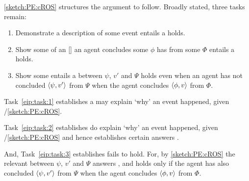 \begin{note}
  \autoref{sketch:PE:cROS} structures the argument to follow.
  Broadly stated, three tasks remain:

  \begin{enumerate}[label=\arabic*., ref=\arabic*]
  \item
    \label{eip:task:1}
    Demonstrate a description of some event entails a \ros{} holds.
  \item
    \label{eip:task:2}
    Show some \se{} of an [] an agent concludes some  \(\phi\) has  from some  \(\Phi\) entails a \ros{} holds.
  \item
    \label{eip:task:3}
    Show some \se{} entails a \ros{} between \(\psi\), \(v'\) and \(\Psi\) holds even when an agent has not concluded \(\langle\psi, v'\rangle\) from \(\Psi\) when the agent concludes \(\langle\phi, v\rangle\) from \(\Phi\).
  \end{enumerate}

  Task~\ref{eip:task:1} establishes a  may explain `why' an event happened, given \progExII{}/\autoref{sketch:PE:cROS}.

  Task~\ref{eip:task:2} establishes  do explain `why' an event happened, given \progExII{}/\autoref{sketch:PE:cROS} and hence establishes certain answers \qWhy{}.

  And, Task~\ref{eip:task:3} establishes \issueInclusion{} fails to hold.
  For, by \autoref{sketch:PE:cROS} the relevant \ros{} between \(\psi\), \(v'\) and \(\Psi\) answers \qWhy{}, and \issueInclusion{} holds only if the agent has also concluded \(\langle\psi, v'\rangle\) from \(\Psi\) when the agent concludes \(\langle\phi, v\rangle\) from \(\Phi\).
\end{note}






